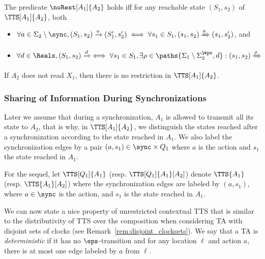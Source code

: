\documentclass{LMCS}
\theoremstyle{plain}\newtheorem*{prop11}{Proposition~\ref{prop:states} bis}
\begin{document}
\begin{defi}
The predicate $\noRest[A_1]{A_2}$ holds iff for any reachable state
$(S_1,s_2)$ of $\TTS[A_1]{A_2}$, both
\begin{itemize}
  \item $\forall a\in\Sigma_2\setminus\sync,
    (S_1,s_2)\xrightarrow{a}(S'_1,s'_2) \iff
    \forall s_1\in S_1, (s_1,s_2)\xRightarrow{a}(s_1,s'_2)$, and
  \item $\forall d\in\Reals,(S_1,s_2)\xrightarrow{d} \iff
    \forall s_1\in S_1, \exists \rho\in \paths{\Sigma_1\setminus\Sigma_{2}^{\not\eps},d}:
    (s_1,s_2)\xRightarrow{\rho}$
\end{itemize}
\end{defi}
\begin{rem}\label{rem:noread_norest}
  If $A_2$ does not read $X_1$, then there is no restriction in
  $\TTS[A_1]{A_2}$.
\end{rem}

\subsubsection*{Sharing of Information During Synchronizations}
Later we assume that during a synchronization, $A_1$ is allowed to transmit all
its state to $A_2$, that is why, in $\TTS[A_1]{A_2}$, we distinguish the
states reached after a synchronization according to the state reached in
$A_1$. We also label the synchronization edges by a pair $(a,s_1)\in
\sync\times Q_1$ where $a$ is the action and $s_1$ the state reached in
$A_1$. 

For the sequel, let $\TTS[Q_1]{A_1}$ (resp. $\TTS[Q_1]{A_1}[A_2]$)
denote $\TTS{A_1}$ (resp. $\TTS{A_1}[A_2]$) where the synchronization edges
are labeled by $(a,s_1)$, where $a\in\sync$ is the action, and $s_1$ is
the state reached in $A_1$.

We can now state a nice property of unrestricted contextual TTS that is similar
to the distributivity of TTS over the composition when considering TA with
disjoint sets of clocks (see Remark~\ref{rem:disjoint_clocksets}). We say that a TA
is \emph{deterministic} if it has no $\eps$-transition and for any location
$\ell$ and action $a$, there is at most one edge labeled by $a$ from
$\ell$.
\end{document}
